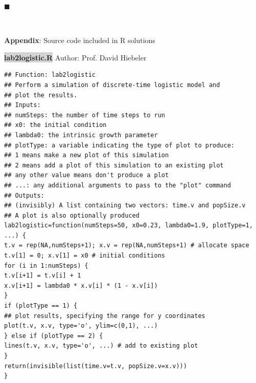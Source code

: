 \documentclass[11pt]{article}
\newcommand{\mybox}{%
    \collectbox{%
        \setlength{\fboxsep}{2pt}%
        \fbox{\BOXCONTENT}%
    }%
}
\begin{document}
\hfill$\blacksquare$


\vfill
\begin{center}
\end{center}
\begin{center}
\vspace{-0.6cm}
\hrulefill \\
\vspace{-0.7cm}
\hrulefill
\end{center}

\pagebreak

\begin{center}
\begin{large}
\textbf{Appendix}: Source code included in R solutions
\end{large}
\end{center}

\vspace{5mm}

\noindent\mybox{\colorbox{lightgray}{\textbf{lab2logistic.R}}} Author: Prof. David Hiebeler

\vspace{3mm}

\begin{lstlisting}
## Function: lab2logistic
## Perform a simulation of discrete-time logistic model and
## plot the results.
## Inputs:
## numSteps: the number of time steps to run
## x0: the initial condition
## lambda0: the intrinsic growth parameter
## plotType: a variable indicating the type of plot to produce:
## 1 means make a new plot of this simulation
## 2 means add a plot of this simulation to an existing plot
## any other value means don't produce a plot
## ...: any additional arguments to pass to the "plot" command
## Outputs:
## (invisibly) A list containing two vectors: time.v and popSize.v
## A plot is also optionally produced
lab2logistic=function(numSteps=50, x0=0.23, lambda0=1.9, plotType=1, ...) {
t.v = rep(NA,numSteps+1); x.v = rep(NA,numSteps+1) # allocate space
t.v[1] = 0; x.v[1] = x0 # initial conditions
for (i in 1:numSteps) {
t.v[i+1] = t.v[i] + 1
x.v[i+1] = lambda0 * x.v[i] * (1 - x.v[i])
}
if (plotType == 1) {
## plot results, specifying the range for y coordinates
plot(t.v, x.v, type='o', ylim=c(0,1), ...)
} else if (plotType == 2) {
lines(t.v, x.v, type='o', ...) # add to existing plot
}
return(invisible(list(time.v=t.v, popSize.v=x.v)))
}
\end{lstlisting}

\pagebreak
\end{document}
